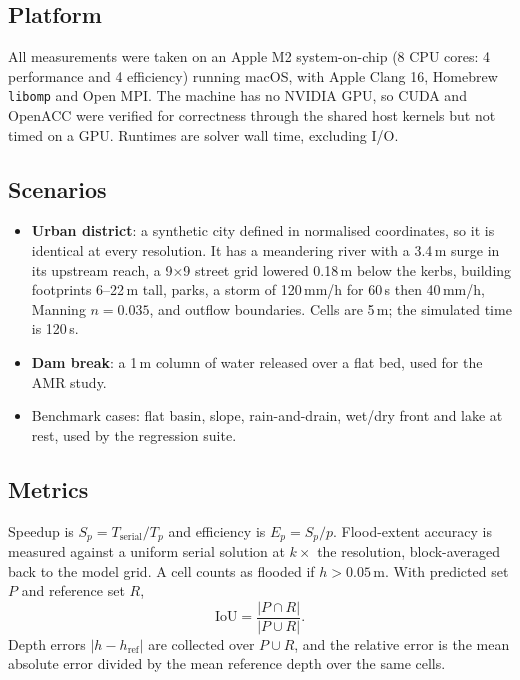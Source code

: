 \documentclass[conference]{IEEEtran}
\begin{document}
\subsection{Platform}
All measurements were taken on an Apple M2 system-on-chip (8 CPU cores:
4 performance and 4 efficiency) running macOS, with Apple Clang 16,
Homebrew \texttt{libomp} and Open MPI. The machine has no NVIDIA GPU, so CUDA
and OpenACC were verified for correctness through the shared host kernels but
not timed on a GPU. Runtimes are solver wall time, excluding I/O.

\subsection{Scenarios}
\begin{itemize}
\item \textbf{Urban district}: a synthetic city defined in normalised
coordinates, so it is identical at every resolution. It has a meandering river
with a 3.4\,m surge in its upstream reach, a 9$\times$9 street grid lowered
0.18\,m below the kerbs, building footprints 6--22\,m tall, parks, a storm of
120\,mm/h for 60\,s then 40\,mm/h, Manning $n=0.035$, and outflow boundaries.
Cells are 5\,m; the simulated time is 120\,s.
\item \textbf{Dam break}: a 1\,m column of water released over a flat bed,
used for the AMR study.
\item Benchmark cases: flat basin, slope, rain-and-drain, wet/dry front and
lake at rest, used by the regression suite.
\end{itemize}

\subsection{Metrics}
Speedup is $S_p = T_{\text{serial}}/T_p$ and efficiency is $E_p = S_p/p$.
Flood-extent accuracy is measured against a uniform serial solution at
$k\times$ the resolution, block-averaged back to the model grid. A cell counts
as flooded if $h>0.05$\,m. With predicted set $P$ and reference set $R$,
\begin{equation}
\text{IoU} = \frac{\lvert P\cap R\rvert}{\lvert P\cup R\rvert}.
\end{equation}
Depth errors $\lvert h-h_{\text{ref}}\rvert$ are collected over $P\cup R$, and
the relative error is the mean absolute error divided by the mean reference
depth over the same cells.

\end{document}

